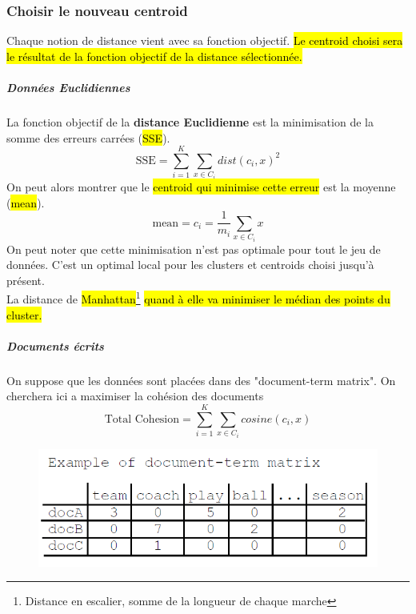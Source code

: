 \documentclass[letterpaper, 12pt]{article}
\newcommand{\alinea}{
\hspace*{0.5cm}}
\begin{document}
			\subsubsection{Choisir le nouveau centroid}
				\alinea Chaque notion de distance vient avec sa fonction
					objectif. \hl{Le centroid choisi sera le résultat de la
					fonction objectif de la distance sélectionnée.}
				\subparagraph{Données Euclidiennes} La fonction objectif
					de la \textbf{distance Euclidienne} est la minimisation
					de la somme des erreurs carrées (\hl{SSE}).
					$$ \text{SSE} = 
						\sum_{i=1}^{K}\sum_{x\in C_i} dist(c_i, x)^2 $$
					On peut alors montrer que le \hl{centroid qui minimise 
					cette erreur} est la moyenne (\hl{mean}).
					$$ \text{mean} = c_i = \frac{1}{m_i}\sum_{x\in C_i} x $$
					On peut noter que cette minimisation n'est pas optimale
					pour tout le jeu de données. C'est un optimal local
					pour les clusters et centroids choisi jusqu'à présent.\\
					La distance de \hl{Manhattan}\footnote{Distance en
					escalier, somme de la longueur de chaque marche} 
					\hl{quand à elle va minimiser le médian des points du
					cluster.}
				\subparagraph{Documents écrits} On suppose que les données
					sont placées dans des "document-term matrix". 
					On cherchera ici a maximiser la cohésion des
					documents
					$$ \text{Total Cohesion} = 
						\sum_{i=1}^{K}\sum_{x\in C_i} cosine(c_i, x) $$
					\begin{figure}[H]
						\centering
						\includegraphics[scale=0.5]{Images/document.png}
						\caption{}
						\label{fig:document-term}
					\end{figure}\noindent
			\newpage
\end{document}

